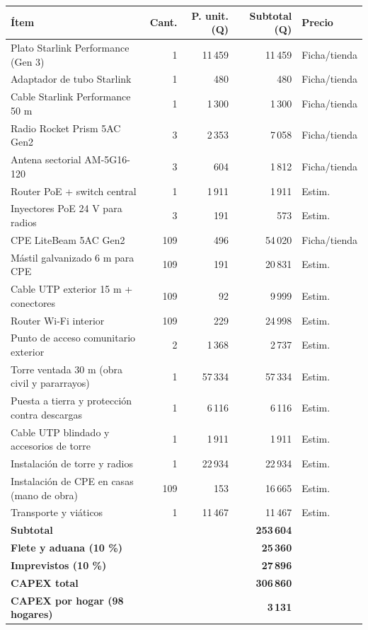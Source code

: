 \begin{tabular}{p{6.2cm}rrrl}\toprule Ítem & Cant. & P. unit. (Q) & Subtotal (Q) & Precio\\\midrule
Plato Starlink Performance (Gen 3) & 1 & 11\,459 & 11\,459 & Ficha/tienda\\
Adaptador de tubo Starlink & 1 & 480 & 480 & Ficha/tienda\\
Cable Starlink Performance 50 m & 1 & 1\,300 & 1\,300 & Ficha/tienda\\
Radio Rocket Prism 5AC Gen2 & 3 & 2\,353 & 7\,058 & Ficha/tienda\\
Antena sectorial AM-5G16-120 & 3 & 604 & 1\,812 & Ficha/tienda\\
Router PoE + switch central & 1 & 1\,911 & 1\,911 & Estim.\\
Inyectores PoE 24 V para radios & 3 & 191 & 573 & Estim.\\
CPE LiteBeam 5AC Gen2 & 109 & 496 & 54\,020 & Ficha/tienda\\
Mástil galvanizado 6 m para CPE & 109 & 191 & 20\,831 & Estim.\\
Cable UTP exterior 15 m + conectores & 109 & 92 & 9\,999 & Estim.\\
Router Wi-Fi interior & 109 & 229 & 24\,998 & Estim.\\
Punto de acceso comunitario exterior & 2 & 1\,368 & 2\,737 & Estim.\\
Torre ventada 30 m (obra civil y pararrayos) & 1 & 57\,334 & 57\,334 & Estim.\\
Puesta a tierra y protección contra descargas & 1 & 6\,116 & 6\,116 & Estim.\\
Cable UTP blindado y accesorios de torre & 1 & 1\,911 & 1\,911 & Estim.\\
Instalación de torre y radios & 1 & 22\,934 & 22\,934 & Estim.\\
Instalación de CPE en casas (mano de obra) & 109 & 153 & 16\,665 & Estim.\\
Transporte y viáticos & 1 & 11\,467 & 11\,467 & Estim.\\
\midrule \textbf{Subtotal} & & & \textbf{253\,604} & \\
\midrule \textbf{Flete y aduana (10 \%)} & & & \textbf{25\,360} & \\
\midrule \textbf{Imprevistos (10 \%)} & & & \textbf{27\,896} & \\
\midrule \textbf{CAPEX total} & & & \textbf{306\,860} & \\
\midrule \textbf{CAPEX por hogar (98 hogares)} & & & \textbf{3\,131} & \\
\bottomrule\end{tabular}
